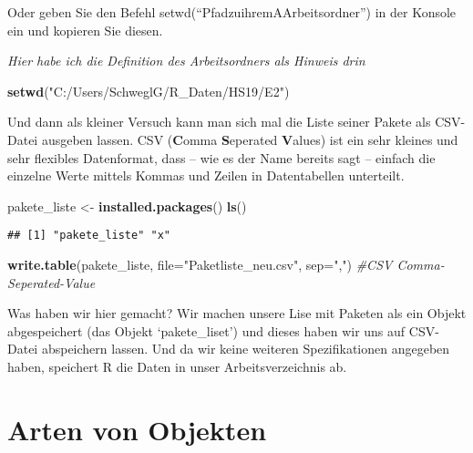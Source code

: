 \documentclass[
]{book}
\newenvironment{Shaded}{\begin{snugshade}}{\end{snugshade}}
\newcommand{\CommentTok}[1]{\textcolor[rgb]{0.56,0.35,0.01}{\textit{#1}}}
\newcommand{\DataTypeTok}[1]{\textcolor[rgb]{0.13,0.29,0.53}{#1}}
\newcommand{\KeywordTok}[1]{\textcolor[rgb]{0.13,0.29,0.53}{\textbf{#1}}}
\newcommand{\NormalTok}[1]{#1}
\newcommand{\StringTok}[1]{\textcolor[rgb]{0.31,0.60,0.02}{#1}}
\begin{document}
Oder geben Sie den Befehl setwd(``PfadzuihremAArbeitsordner'') in der Konsole ein und kopieren Sie diesen.

\emph{Hier habe ich die Definition des Arbeitsordners als Hinweis drin}

\begin{Shaded}
\begin{Highlighting}[]
\KeywordTok{setwd}\NormalTok{(}\StringTok{"C:/Users/SchweglG/R_Daten/HS19/E2"}\NormalTok{)}
\end{Highlighting}
\end{Shaded}

Und dann als kleiner Versuch kann man sich mal die Liste seiner Pakete als CSV-Datei ausgeben lassen. CSV (\textbf{C}omma \textbf{S}eperated \textbf{V}alues) ist ein sehr kleines und sehr flexibles Datenformat, dass -- wie es der Name bereits sagt -- einfach die einzelne Werte mittels Kommas und Zeilen in Datentabellen unterteilt.

\begin{Shaded}
\begin{Highlighting}[]
\NormalTok{pakete_liste <-}\StringTok{ }\KeywordTok{installed.packages}\NormalTok{()}
\KeywordTok{ls}\NormalTok{()}
\end{Highlighting}
\end{Shaded}

\begin{verbatim}
## [1] "pakete_liste" "x"
\end{verbatim}

\begin{Shaded}
\begin{Highlighting}[]
\KeywordTok{write.table}\NormalTok{(pakete_liste, }\DataTypeTok{file=}\StringTok{"Paketliste_neu.csv"}\NormalTok{, }\DataTypeTok{sep=}\StringTok{","}\NormalTok{) }\CommentTok{#CSV Comma-Seperated-Value}
\end{Highlighting}
\end{Shaded}

Was haben wir hier gemacht? Wir machen unsere Lise mit Paketen als ein Objekt abgespeichert (das Objekt `pakete\_liset') und dieses haben wir uns auf CSV-Datei abspeichern lassen. Und da wir keine weiteren Spezifikationen angegeben haben, speichert R die Daten in unser Arbeitsverzeichnis ab.

\hypertarget{arten-von-objekten}{%
\section{Arten von Objekten}\label{arten-von-objekten}}
\end{document}
